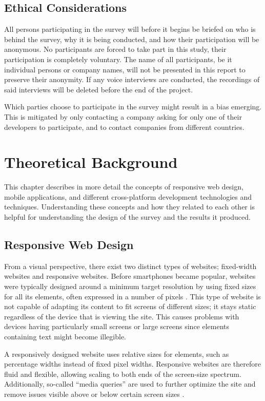 \documentclass[a4paper,12pt]{article}
\begin{document}
\subsection{Ethical Considerations}
\label{Method_ethics}
All persons participating in the survey will before it begins be briefed on who is behind the survey, why it is being conducted, and how their participation will be anonymous. No participants are forced to take part in this study, their participation is completely voluntary.
The name of all participants, be it individual persons or company names, will not be presented in this report to preserve their anonymity. If any voice interviews are conducted, the recordings of said interviews will be deleted before the end of the project.

Which parties choose to participate in the survey might result in a bias emerging. This is mitigated by only contacting a company asking for only one of their developers to participate, and to contact companies from different countries.
\newpage

\section{Theoretical Background}
\label{Theory}
This chapter describes in more detail the concepts of responsive web design, mobile applications, and different cross-platform development technologies and techniques. Understanding these concepts and how they related to each other is helpful for understanding the design of the survey and the results it produced.

\subsection{Responsive Web Design}
\label{Theory_responsiveWeb}
From a visual perspective, there exist two distinct types of websites; fixed-width websites and responsive websites. Before smartphones became popular, websites were typically designed around a minimum target resolution by using fixed sizes for all its elements, often expressed in a number of pixels \cite{resp_web_2011}. This type of website is not capable of adapting its content to fit screens of different sizes; it stays static regardless of the device that is viewing the site. This causes problems with devices having particularly small screens or large screens since elements containing text might become illegible.

A responsively designed website uses relative sizes for elements, such as percentage widths instead of fixed pixel widths. Responsive websites are therefore fluid and flexible, allowing scaling to both ends of the screen-size spectrum. Additionally, so-called “media queries” are used to further optimize the site and remove issues visible above or below certain screen sizes \cite{resp_web_2011}.
\end{document}
